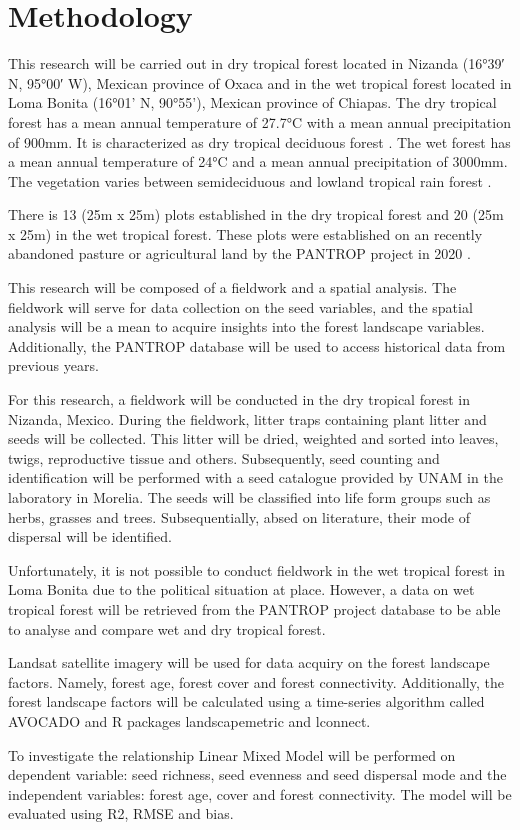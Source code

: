 \documentclass[11pt]{article}
\begin{document}
\section*{Methodology}
This research will be carried out in dry tropical forest located in Nizanda (16°39′ N, 95°00′ W), Mexican province of Oxaca and in the wet tropical forest located in Loma Bonita (16°01’ N, 90°55’), Mexican province of Chiapas. The dry tropical forest has a mean annual temperature of 27.7°C with a mean annual precipitation of 900mm. It is characterized as dry tropical deciduous forest \citep{hordijkLandUseHistory2024}. The wet forest has a mean annual temperature of 24°C and a mean annual precipitation of 3000mm. The vegetation varies between semideciduous and lowland tropical rain forest \citep{hordijkLandUseHistory2024}.

There is 13 (25m x 25m) plots established in the dry tropical forest and 20 (25m x 25m) in the wet tropical forest. These plots were established on an recently abandoned pasture or agricultural land by the PANTROP project in 2020 \citep{hordijkLandUseHistory2024}.

This research will be composed of a fieldwork and a spatial analysis. The fieldwork will serve for data collection on the seed variables, and the spatial analysis will be a mean to acquire insights into the forest landscape variables. 
Additionally, the PANTROP database will be used to access historical data from previous years. 

For this research, a fieldwork will be conducted in the dry tropical forest in Nizanda, Mexico. During the fieldwork, litter traps containing plant litter and seeds will be collected. This litter will be dried, weighted and sorted into leaves, twigs, reproductive tissue and others. 
Subsequently, seed counting and identification will be performed with a seed catalogue provided by UNAM in the laboratory in Morelia. The seeds will be classified into life form groups such as herbs, grasses and trees. Subsequentially, absed on literature, their mode of dispersal will be identified.

Unfortunately, it is not possible to conduct fieldwork in the wet tropical forest in Loma Bonita due to the political situation at place. However, a data on wet tropical forest will be retrieved from the PANTROP project database to be able to analyse and compare wet and dry tropical forest.

Landsat satellite imagery will be used for data acquiry on the forest landscape factors. Namely, forest age, forest cover and forest connectivity. Additionally, the forest landscape factors will be calculated using a time-series algorithm called AVOCADO and R packages landscapemetric and lconnect.

To investigate the relationship Linear Mixed Model will be performed on dependent variable: seed richness, seed evenness and seed dispersal mode and the independent variables: forest age, cover and forest connectivity. The model will be evaluated using R2, RMSE and bias.

\newpage

\end{document}

